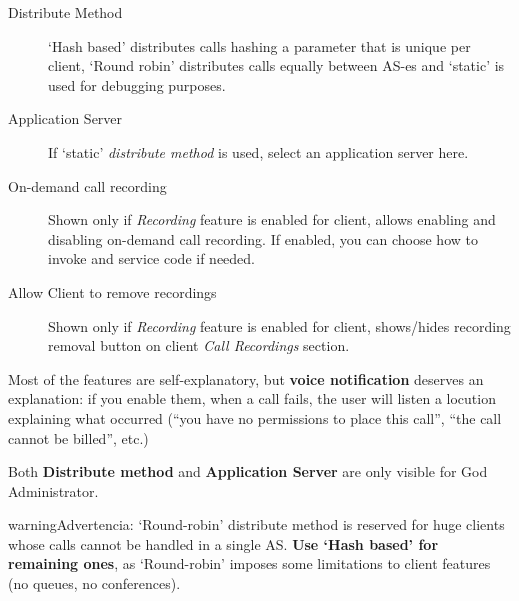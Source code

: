 \documentclass[letterpaper,10pt,spanish]{sphinxmanual}
\begin{document}
\begin{description}
\item[{Distribute Method}] \leavevmode{}\label{administration_portal/brand/clients/virtual_pbx:term-distribute-method}
`Hash based' distributes calls hashing a parameter that is unique per
client, `Round robin' distributes calls equally between AS-es and
`static' is used for debugging purposes.

\item[{Application Server}] \leavevmode{}\label{administration_portal/brand/clients/virtual_pbx:term-application-server}
If `static' \emph{distribute method} is used, select an application server here.

\item[{On-demand call recording}] \leavevmode{}\label{administration_portal/brand/clients/virtual_pbx:term-on-demand-call-recording}
Shown only if \emph{Recording} feature is enabled for client, allows enabling and
disabling on-demand call recording. If enabled, you can choose how to invoke
and service code if needed.

\item[{Allow Client to remove recordings}] \leavevmode{}\label{administration_portal/brand/clients/virtual_pbx:term-allow-client-to-remove-recordings}
Shown only if \emph{Recording} feature is enabled for client, shows/hides recording
removal button on client \emph{Call Recordings} section.

\end{description}

Most of the features are self-explanatory, but \textbf{voice notification} deserves
an explanation: if you enable them, when a call fails, the user will listen a
locution explaining what occurred (``you have no permissions to place this call'',
``the call cannot be billed'', etc.)

Both \textbf{Distribute method} and \textbf{Application Server} are only visible for God
Administrator.

\begin{notice}{warning}{Advertencia:}
`Round-robin' distribute method is reserved for huge clients
whose calls cannot be handled in a single AS. \textbf{Use `Hash based'
for remaining ones}, as `Round-robin' imposes some limitations
to client features (no queues, no conferences).
\end{notice}
\end{document}
